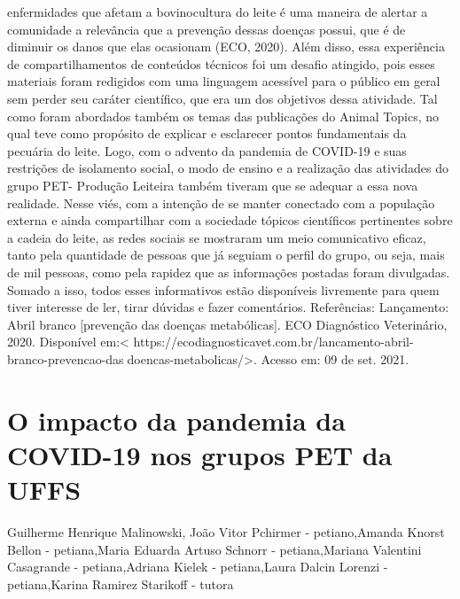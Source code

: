 enfermidades que afetam a bovinocultura do leite é uma maneira de alertar a comunidade a 
relevância que a prevenção dessas doenças possui, que é de diminuir os danos que elas ocasionam 
(ECO, 2020). 
Além disso, essa experiência de compartilhamentos de conteúdos técnicos foi um 
desafio atingido, pois esses materiais foram redigidos com uma linguagem acessível para o público 
em geral sem perder seu caráter científico, que era um dos objetivos dessa atividade. Tal como 
foram abordados também os temas das publicações do Animal Topics, no qual teve como 
propósito de explicar e esclarecer pontos fundamentais da pecuária do leite.
Logo, com o advento da pandemia de COVID-19 e suas restrições de isolamento 
social, o modo de ensino e a realização das atividades do grupo PET- Produção Leiteira também 
tiveram que se adequar a essa nova realidade. Nesse viés, com a intenção de se manter conectado 
com a população externa e ainda compartilhar com a sociedade tópicos científicos pertinentes 
sobre a cadeia do leite, as redes sociais se mostraram um meio comunicativo eficaz, tanto pela 
quantidade de pessoas que já seguiam o perfil do grupo, ou seja, mais de mil pessoas, como pela 
rapidez que as informações postadas foram divulgadas. Somado a isso, todos esses informativos 
estão disponíveis livremente para quem tiver interesse de ler, tirar dúvidas e fazer comentários. 
Referências:
Lançamento: Abril branco [prevenção das doenças metabólicas]. ECO Diagnóstico Veterinário, 
2020. Disponível em:< https://ecodiagnosticavet.com.br/lancamento-abril-branco-prevencao-dasdoencas-metabolicas/>. Acesso em: 09 de set. 2021.



\section{O impacto da pandemia da COVID-19 nos grupos PET da UFFS}

Guilherme Henrique Malinowski, João Vitor Pchirmer - petiano,Amanda Knorst Bellon - petiana,Maria Eduarda Artuso Schnorr - petiana,Mariana Valentini Casagrande - petiana,Adriana Kielek - petiana,Laura Dalcin Lorenzi - petiana,Karina Ramirez Starikoff - tutora

